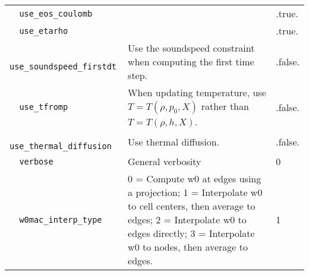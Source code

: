 {\begin{center}
\begin{longtable}{|l|p{3.25in}|l|}
\verb=  use_eos_coulomb  = &    &  .true. \\
\verb=  use_etarho  = &    &  .true. \\
\verb=  use_soundspeed_firstdt  = &   Use the soundspeed constraint when computing the first time step.  &  .false. \\
\verb=  use_tfromp  = &   When updating temperature, use $T=T(\rho,p_0,X) $ rather than $T=T(\rho,h,X)$.  &  .false. \\
\verb=  use_thermal_diffusion  = &   Use thermal diffusion.  &  .false. \\
\verb=  verbose  = &   General verbosity  &  0 \\
\verb=  w0mac_interp_type  = &   0 = Compute w0 at edges using a projection; 1 = Interpolate w0 to cell centers, then average to edges; 2 = Interpolate w0 to edges directly; 3 = Interpolate w0 to nodes, then average to edges.  &  1 \\


\end{longtable}
\end{center}

} %

%


